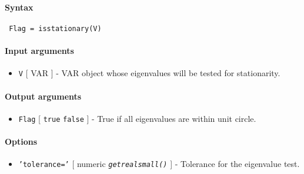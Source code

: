 


	\paragraph{Syntax}
 
 \begin{verbatim}
 Flag = isstationary(V)
 \end{verbatim}
 
 \paragraph{Input arguments}
 
 \begin{itemize}
 \item
   \texttt{V} {[} VAR {]} - VAR object whose eigenvalues will be tested
   for stationarity.
 \end{itemize}
 
 \paragraph{Output arguments}
 
 \begin{itemize}
 \item
   \texttt{Flag} {[} \texttt{true} \textbar{} \texttt{false} {]} - True
   if all eigenvalues are within unit circle.
 \end{itemize}
 
 \paragraph{Options}
 
 \begin{itemize}
 \item
   \texttt{'tolerance='} {[} numeric \textbar{}
   \emph{\texttt{getrealsmall()}} {]} - Tolerance for the eigenvalue
   test.
 \end{itemize}



